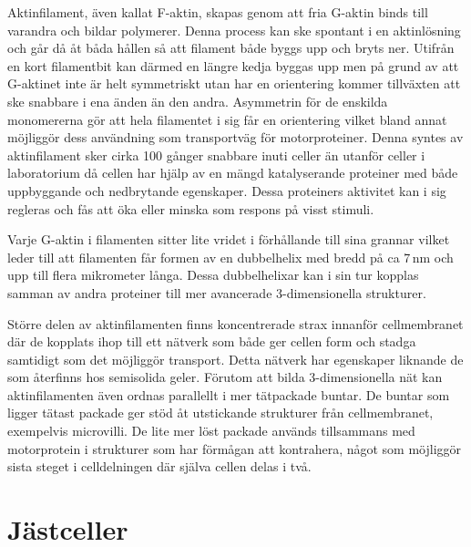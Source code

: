 Aktinfilament, även kallat F-aktin, skapas genom att fria G-aktin binds till varandra och bildar polymerer. Denna process kan ske spontant i en aktinlösning och går då åt båda hållen så att filament både byggs upp och bryts ner. Utifrån en kort filamentbit kan därmed en längre kedja byggas upp men på grund av att G-aktinet inte är helt symmetriskt utan har en orientering kommer tillväxten att ske snabbare i ena änden än den andra. Asymmetrin för de enskilda monomererna gör att hela filamentet i sig får en orientering vilket bland annat möjliggör dess användning som transportväg för motorproteiner. Denna syntes av aktinfilament sker cirka 100 gånger snabbare inuti celler än utanför celler i laboratorium då cellen har hjälp av en mängd  katalyserande proteiner med både uppbyggande och nedbrytande egenskaper. Dessa proteiners aktivitet kan i sig regleras och fås att öka eller minska som respons på visst stimuli.

Varje G-aktin i filamenten sitter lite vridet i förhållande till sina grannar vilket leder till att filamenten får formen av en dubbelhelix med bredd på ca 7\,nm och upp till flera mikrometer långa. Dessa dubbelhelixar kan i sin tur kopplas samman av andra proteiner till mer avancerade 3-dimensionella strukturer.

Större delen av aktinfilamenten finns koncentrerade strax innanför cellmembranet där de kopplats ihop till ett nätverk som både ger cellen form och stadga samtidigt som det möjliggör transport. Detta nätverk har egenskaper liknande de som återfinns hos semisolida geler. Förutom att bilda 3-dimensionella nät kan aktinfilamenten även ordnas parallellt i mer tätpackade buntar. De buntar som ligger tätast packade ger stöd åt utstickande strukturer från cellmembranet, exempelvis microvilli. De lite mer löst packade används tillsammans med motorprotein i strukturer som har förmågan att kontrahera, något som möjliggör sista steget i celldelningen där själva cellen delas i två. 



\section{Jästceller}

